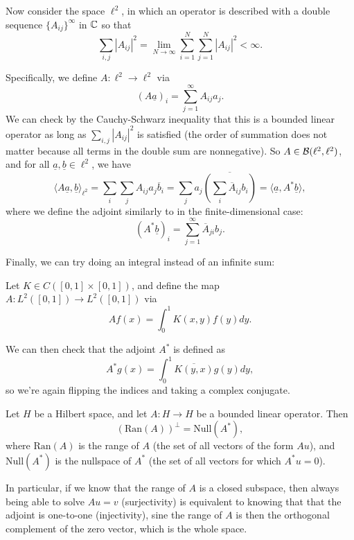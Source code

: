 \begin{example}
Now consider the space $\ell^2$, in which an operator is described with a double sequence $\{A_{ij}\}^\infty$ in $\mathbb C$ so that 
\[
    \sum_{i,j} |A_{ij}|^2 = \lim_{N \to \infty} \sum_{i=1}^N \sum_{j=1}^N |A_{ij}|^2 < \infty.
\]
\end{example}

Specifically, we define $A: \ell^2 \to \ell^2$ via
\[
    (A \underline{a})_i = \sum_{j=1}^{\infty} A_{ij} a_j.
\]
We can check by the Cauchy-Schwarz inequality that this is a bounded linear operator as long as $\sum_{i,j} |A_{ij}|^2$ is satisfied (the order of summation does not matter because all terms in the double sum are nonnegative). So $A \in \mathcal{B}(\ell^2, \ell^2)$, and for all $\underline{a}, \underline{b} \in \ell^2$, we have
\[
    \langle A \underline{a}, \underline{b} \rangle_{\ell^2} = \sum_i \sum_j A_{ij} a_j \overline{b}_i = \sum_j a_j \overline{\left(\sum_i \overline{A}_{ij} b_i \right)} = \langle \underline{a}, A^\ast \underline{b} \rangle,
\]
where we define the adjoint similarly to in the finite-dimensional case:
\[
    (A^\ast\underline{b})_i = \sum_{j=1}^{\infty} \overline{A}_{ji} b_j.
\]

Finally, we can try doing an integral instead of an infinite sum:

\begin{example}
Let $K \in C([0, 1] \times [0, 1])$, and define the map $A: L^2([0, 1]) \to L^2([0, 1])$ via
\[
    Af(x) = \int_0^1 K(x, y) f(y) dy.
\]
\end{example}

We can then check that the adjoint $A^\ast$ is defined as
\[
    A^\ast g(x) = \int_0^1 \overline{K(y, x)} g(y) dy,
\]
so we're again flipping the indices and taking a complex conjugate. 

\begin{theorem}
Let $H$ be a Hilbert space, and let $A: H \to H$ be a bounded linear operator. Then 
\[
    (\text{Ran}(A))^\perp = \text{Null}(A^\ast),
\]
where $\text{Ran}(A)$ is the range of $A$ (the set of all vectors of the form $Au$), and $\text{Null}(A^\ast)$ is the nullspace of $A^\ast$ (the set of all vectors for which $A^\ast u = 0$).
\end{theorem}

In particular, if we know that the range of $A$ is a closed subspace, then always being able to solve $Au = v$ (surjectivity) is equivalent to knowing that that the adjoint is one-to-one (injectivity), sine the range of $A$ is then the orthogonal complement of the zero vector, which is the whole space. 

